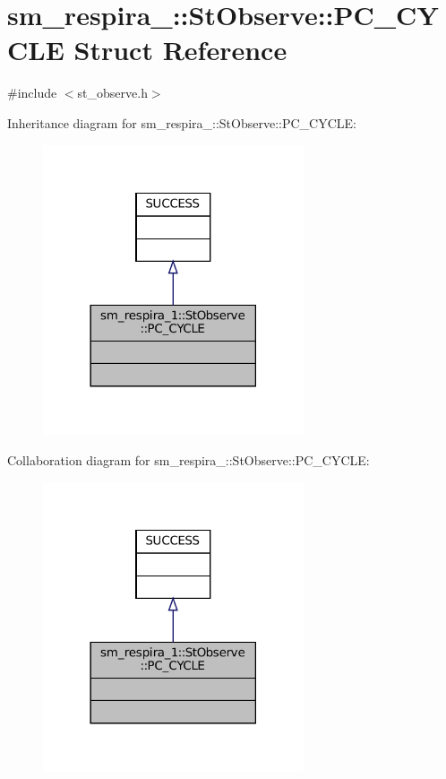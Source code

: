 \hypertarget{structsm__respira__1_1_1StObserve_1_1PC__CYCLE}{}\section{sm\+\_\+respira\+\_\+:\+:St\+Observe\+:\+:P\+C\+\_\+\+C\+Y\+C\+LE Struct Reference}
\label{structsm__respira__1_1_1StObserve_1_1PC__CYCLE}


{\ttfamily \#include $<$st\+\_\+observe.\+h$>$}



Inheritance diagram for sm\+\_\+respira\+\_\+:\+:St\+Observe\+:\+:P\+C\+\_\+\+C\+Y\+C\+LE\+:
\nopagebreak
\begin{figure}[H]
\begin{center}
\leavevmode
\includegraphics[width=218pt]{structsm__respira__1_1_1StObserve_1_1PC__CYCLE__inherit__graph}
\end{center}
\end{figure}


Collaboration diagram for sm\+\_\+respira\+\_\+:\+:St\+Observe\+:\+:P\+C\+\_\+\+C\+Y\+C\+LE\+:
\nopagebreak
\begin{figure}[H]
\begin{center}
\leavevmode
\includegraphics[width=218pt]{structsm__respira__1_1_1StObserve_1_1PC__CYCLE__coll__graph}
\end{center}
\end{figure}


